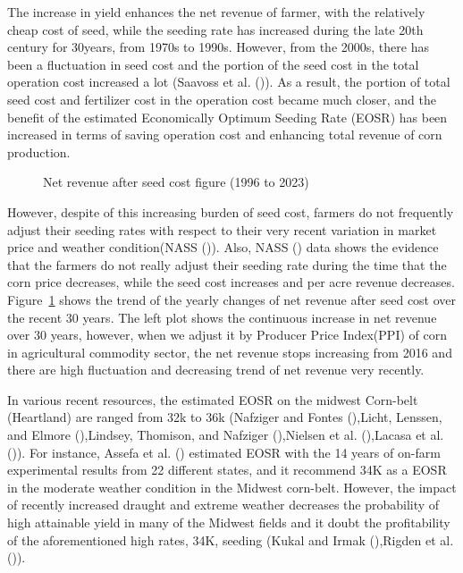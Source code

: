 \documentclass[
]{article}
\begin{document}
The increase in yield enhances the net revenue of farmer, with the
relatively cheap cost of seed, while the seeding rate has increased
during the late 20th century for 30years, from 1970s to 1990s. However,
from the 2000s, there has been a fluctuation in seed cost and the
portion of the seed cost in the total operation cost increased a lot
(Saavoss et al. ()). As a result,
the portion of total seed cost and fertilizer cost in the operation cost
became much closer, and the benefit of the estimated Economically
Optimum Seeding Rate (EOSR) has been increased in terms of saving
operation cost and enhancing total revenue of corn production.

\begin{figure}


\caption{\label{fig-rev_seed_comb}Net revenue after seed cost figure
(1996 to 2023)}

\end{figure}%

However, despite of this increasing burden of seed cost, farmers do not
frequently adjust their seeding rates with respect to their very recent
variation in market price and weather condition(NASS
()). Also, NASS
() data shows the evidence that the farmers
do not really adjust their seeding rate during the time that the corn
price decreases, while the seed cost increases and per acre revenue
decreases. Figure~\ref{fig-rev_seed_comb} shows the trend of the yearly
changes of net revenue after seed cost over the recent 30 years. The
left plot shows the continuous increase in net revenue over 30 years,
however, when we adjust it by Producer Price Index(PPI) of corn in
agricultural commodity sector, the net revenue stops increasing from
2016 and there are high fluctuation and decreasing trend of net revenue
very recently.

In various recent resources, the estimated EOSR on the midwest Corn-belt
(Heartland) are ranged from 32k to 36k (Nafziger and Fontes
(),Licht, Lenssen, and Elmore
(),Lindsey, Thomison, and Nafziger
(),Nielsen et al.
(),Lacasa et al.
()). For instance, Assefa et al.
() estimated EOSR with the 14
years of on-farm experimental results from 22 different states, and it
recommend 34K as a EOSR in the moderate weather condition in the Midwest
corn-belt. However, the impact of recently increased draught and extreme
weather decreases the probability of high attainable yield in many of
the Midwest fields and it doubt the profitability of the aforementioned
high rates, 34K, seeding (Kukal and Irmak
(),Rigden et al.
()).
\end{document}
